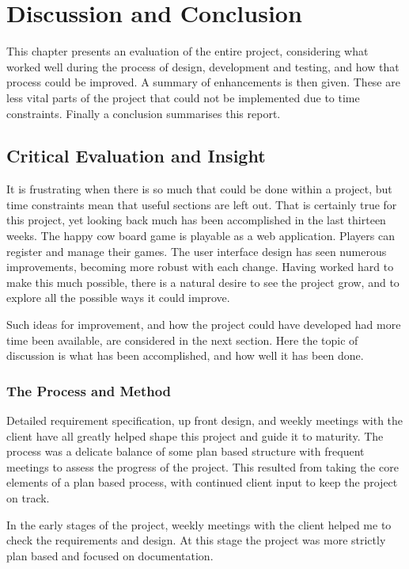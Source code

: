 \chapter{Discussion and Conclusion}
This chapter presents an evaluation of the entire project, considering what worked well during the process of design, development and testing, and how that process could be improved. A summary of enhancements is then given. These are less vital parts of the project that could not be implemented due to time constraints. Finally a conclusion summarises this report.

\section{Critical Evaluation and Insight}
It is frustrating when there is so much that could be done within a project, but time constraints mean that useful sections are left out. That is certainly true for this project, yet looking back much has been accomplished in the last thirteen weeks. The happy cow board game is playable as a web application. Players can register and manage their games. The user interface design has seen numerous improvements, becoming more robust with each change. Having worked hard to make this much possible, there is a natural desire to see the project grow, and to explore all the possible ways it could improve.

Such ideas for improvement, and how the project could have developed had more time been available, are considered in the next section. Here the topic of discussion is what has been accomplished, and how well it has been done.

\subsection{The Process and Method}
Detailed requirement specification, up front design, and weekly meetings with the client have all greatly helped shape this project and guide it to maturity. The process was a delicate balance of some plan based structure with frequent meetings to assess the progress of the project. This resulted from taking the core elements of a plan based process, with continued client input to keep the project on track.

In the early stages of the project, weekly meetings with the client helped me to check the requirements and design. At this stage the project was more strictly plan based and focused on documentation.

